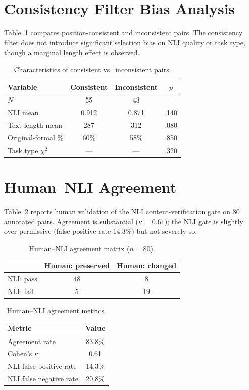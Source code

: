 \documentclass[11pt,a4paper]{article}
\begin{document}
\section{Consistency Filter Bias Analysis}

Table~\ref{tab:filter_bias} compares position-consistent and inconsistent pairs.
The consistency filter does not introduce significant selection bias on NLI quality or task type, though a marginal length effect is observed.

\begin{table}[h]
\centering
\small
\caption{Characteristics of consistent vs.\ inconsistent pairs.}
\label{tab:filter_bias}
\begin{tabular}{lccc}
\toprule
\textbf{Variable} & \textbf{Consistent} & \textbf{Inconsistent} & \textbf{$p$} \\
\midrule
$N$ & 55 & 43 & --- \\
NLI mean & 0.912 & 0.871 & .140 \\
Text length mean & 287 & 312 & .080 \\
Original-formal \% & 60\% & 58\% & .850 \\
Task type $\chi^2$ & --- & --- & .320 \\
\bottomrule
\end{tabular}
\end{table}

\section{Human--NLI Agreement}

Table~\ref{tab:human_nli} reports human validation of the NLI content-verification gate on 80 annotated pairs.
Agreement is substantial ($\kappa=0.61$); the NLI gate is slightly over-permissive (false positive rate 14.3\%) but not severely so.

\begin{table}[h]
\centering
\small
\caption{Human--NLI agreement matrix ($n=80$).}
\label{tab:human_nli}
\begin{tabular}{lcc}
\toprule
& \textbf{Human: preserved} & \textbf{Human: changed} \\
\midrule
NLI: pass & 48 & 8 \\
NLI: fail & 5 & 19 \\
\bottomrule
\end{tabular}
\end{table}

\begin{table}[h]
\centering
\small
\caption{Human--NLI agreement metrics.}
\label{tab:agreement_metrics}
\begin{tabular}{lc}
\toprule
\textbf{Metric} & \textbf{Value} \\
\midrule
Agreement rate & 83.8\% \\
Cohen's $\kappa$ & 0.61 \\
NLI false positive rate & 14.3\% \\
NLI false negative rate & 20.8\% \\
\bottomrule
\end{tabular}
\end{table}
\end{document}
